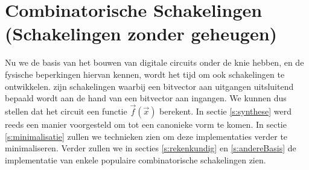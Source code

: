 \chapter{Combinatorische Schakelingen (Schakelingen zonder geheugen)}
\label{ch:combinatoric}
\begin{chapterintro}
Nu we de basis van het bouwen van digitale circuits onder de knie hebben, en de fysische beperkingen hiervan kennen, wordt het tijd om ook schakelingen te ontwikkelen.  zijn schakelingen waarbij een bitvector aan uitgangen uitsluitend bepaald wordt aan de hand van een bitvector aan ingangen. We kunnen dus stellen dat het circuit een functie $\vec{f}(\vec{x})$ berekent. In sectie \ref{s:synthese} werd reeds een manier voorgesteld om tot een canonieke vorm te komen. In sectie \ref{s:minimalisatie} zullen we technieken zien om deze implementaties verder te minimaliseren. Verder zullen we in secties \ref{s:rekenkundig} en \ref{s:andereBasis} de implementatie van enkele populaire combinatorische schakelingen zien.%
\end{chapterintro}
\minitoc[n]
